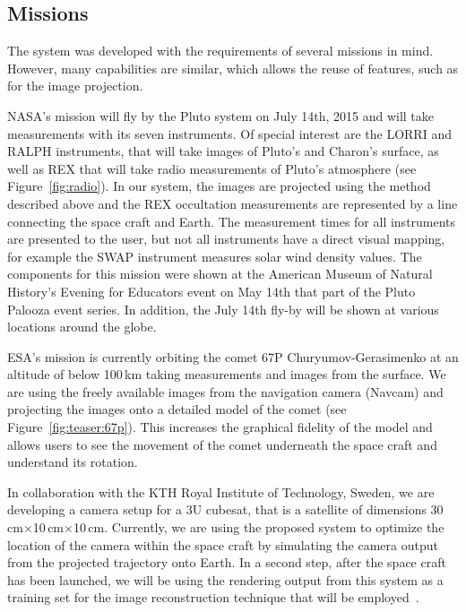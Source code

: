 \documentclass{vgtc}                          %
\begin{document}
\subsection{Missions}
The system was developed with the requirements of several missions in mind. However, many capabilities are similar, which allows the reuse of features, such as for the image projection.

 NASA's mission will fly by the Pluto system on July 14th, 2015 and will take measurements with its seven instruments. Of special interest are the LORRI and RALPH instruments, that will take images of Pluto's and Charon's surface, as well as REX that will take radio measurements of Pluto's atmosphere (see Figure~\ref{fig:radio}). In our system, the images are projected using the method described above and the REX occultation measurements are represented by a line connecting the space craft and Earth. The measurement times for all instruments are presented to the user, but not all instruments have a direct visual mapping, for example the SWAP instrument measures solar wind density values. The components for this mission were shown at the American Museum of Natural History's Evening for Educators event on May 14th that part of the Pluto Palooza event series. In addition, the July 14th fly-by will be shown at various locations around the globe.

 ESA's mission is currently orbiting the comet 67P Churyumov-Gerasimenko at an altitude of below 100\,km taking measurements and images from the surface. We are using the freely available images from the navigation camera (Navcam) and projecting the images onto a detailed model of the comet (see Figure~\ref{fig:teaser:67p}). This increases the graphical fidelity of the model and allows users to see the movement of the comet underneath the space craft and understand its rotation.

 In collaboration with the KTH Royal Institute of Technology, Sweden, we are developing a camera setup for a 3U cubesat, that is a satellite of dimensions 30\,cm$\times$10\,cm$\times$10\,cm. Currently, we are using the proposed system to optimize the location of the camera within the space craft by simulating the camera output from the projected trajectory onto Earth. In a second step, after the space craft has been launched, we will be using the rendering output from this system as a training set for the image reconstruction technique that will be employed~\cite{MKU15}.

%


\end{document}
